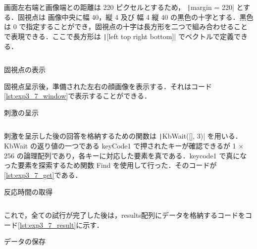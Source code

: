 \documentclass[dvipdfmx, titlepage, t]{jsarticle}
\begin{document}
    \begin{program}
    \inputminted[linenos, firstline=5, lastline=12, frame=lines, fontsize=\small]{matlab}{code/Exp3_7_Matlab.m}
    \end{program}

    画面左右端と画像端との距離は 220 ピクセルとするため， \texttt|margin = 220| とする．固視点は 画像中央に幅 40，縦 4 及び 幅 4 縦 40 の黒色の十字とする．黒色は 0 で指定することができ，固視点の十字は長方形を二つで組み合わせることで表現できる．ここで長方形は \texttt|[left top right bottom]| でベクトルで定義できる．
    \begin{program}[H]
        \inputminted[linenos, firstline=32, lastline=36, frame=lines, fontsize=\small]{matlab}{code/Exp3_7_Matlab.m}      
        \caption{固視点の表示}
        \label{lst:exp3_7_eye}
    \end{program}

    固視点呈示後，準備された左右の顔画像を表示する．それはコード\ref{lst:exp3_7_window}で表示することができる．
    \begin{program}[H]
        \caption{刺激の呈示}
        \inputminted[linenos, 
        firstline=95,
        lastline=99,
        frame=lines,
        fontsize=\small]{matlab}{code/Exp3_7_Matlab.m}
        \label{lst:exp3_7_window}
    \end{program}

    刺激を呈示した後の回答を格納するための関数は \texttt|KbWait([], 3)| を用いる．KbWait の返り値の一つである keyCode1 で押されたキーが確認できるが 1 $\times$ 256 の論理配列であり，各キーに対応した要素を真である．keycode1 で真になった要素を探索するため関数 Find を使用して行った．そのコードが\ref{lst:exp3_7_get}である．

    \begin{program}[H]
        \caption{反応時間の取得}
        \inputminted[linenos,
            firstline=102,
            lastline=107,
            frame=lines,
            fontsize = \small
        ]{matlab}{code/Exp3_7_Matlab.m}
        \label{lst:exp3_7_get}
    \end{program}

    これで，全ての試行が完了した後は，results配列にデータを格納するコードをコード\ref{lst:exp3_7_result}に示す．

    \begin{program}[H]
        \caption{データの保存}
        \inputminted[linenos,
        firstline=106,
        lastline=111,
        frame=lines,
        fontsize = \small]{matlab}{code/Exp3_7_Matlab.m}
        \label{lst:exp3_7_result}
    \end{program}
\end{document}
